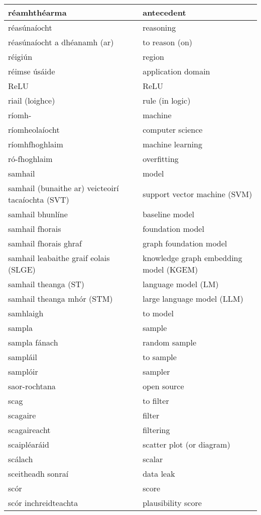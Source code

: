 \begin{longtable}{|l|l|}
		réamhthéarma&antecedent\\ \hline 
		réasúnaíocht&reasoning\\ \hline 
		réasúnaíocht a dhéanamh (ar)&to reason (on)\\ \hline 
		réigiún&region\\ \hline 
		réimse úsáide&application domain\\ \hline 
		ReLU&ReLU\\ \hline 
		riail (loighce)&rule (in logic)\\ \hline 
		ríomh-&machine\\ \hline 
		ríomheolaíocht&computer science\\ \hline 
		ríomhfhoghlaim&machine learning\\ \hline 
		ró-fhoghlaim&overfitting\\ \hline 
		samhail&model\\ \hline 
		samhail (bunaithe ar) veicteoirí tacaíochta (SVT)&support vector machine (SVM)\\ \hline 
		samhail bhunlíne&baseline model\\ \hline 
		samhail fhorais&foundation model\\ \hline 
		samhail fhorais ghraf&graph foundation model\\ \hline 
		samhail leabaithe graif eolais (SLGE)&knowledge graph embedding model (KGEM)\\ \hline 
		samhail theanga (ST)&language model (LM)\\ \hline 
		samhail theanga mhór (STM)&large language model (LLM)\\ \hline 
		samhlaigh&to model\\ \hline 
		sampla&sample\\ \hline 
		sampla fánach&random sample\\ \hline 
		sampláil&to sample\\ \hline 
		samplóir&sampler\\ \hline 
		saor-rochtana&open source\\ \hline 
		scag&to filter\\ \hline 
		scagaire&filter\\ \hline 
		scagaireacht&filtering\\ \hline 
		scaipléaráid&scatter plot (or diagram)\\ \hline 
		scálach&scalar\\ \hline 
		sceitheadh sonraí&data leak\\ \hline 
		scór&score\\ \hline 
		scór inchreidteachta&plausibility score\\ \hline 

\end{longtable}
